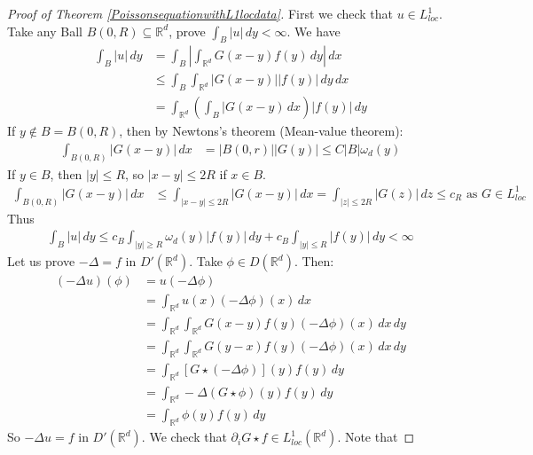 \documentclass{report}
\theoremstyle{tommy}
\begin{document}
  \begin{proof}[Proof of Theorem \ref{PoissonsequationwithL1locdata}]
    First we check that \(u \in L_{loc}^1\). Take any Ball \(B(0, R) \subseteq \mathbb{R}^d\), prove \(\int_B |u| \, dy < \infty\). We have 
    \begin{align*}
      \int_B |u| \, dy 
      &= \int_B \left| \int_{\mathbb{R}^d} G(x-y) f(y) \, dy \right| \, dx \\
      &\le \int_B \int_{\mathbb{R}^d} |G(x-y)||f(y)| \, dy \, dx \\
      &= \int_{\mathbb{R}^d} \left(\int_B |G(x-y) \, dx\right)|f(y)| \, dy
    \end{align*}
    If \(y \notin B = B(0,R)\), then by Newtons's theorem (Mean-value theorem):
    \begin{align*}
      \int_{B(0, R)} |G(x-y)| \, dx
      &= |B(0, r)| |G(y)|
      \le C|B| \omega_d(y)
    \end{align*}
    If \(y \in B\), then \(|y| \le R\), so \(|x-y| \le 2 R\) if \(x \in B\).
    \begin{align*}
      \int_{B(0,R)}|G(x-y)| \, dx
      &\le \int_{|x-y| \le 2 R} |G(x-y)| \, dx
      = \int_{|z| \le 2 R} |G(z)| \, dz 
      \le c_R \text{ as } G \in L_{loc}^1
    \end{align*}
    Thus
    \begin{align*}
      \int_B |u| \, dy 
      \le c_B \int_{|y| \ge R} \omega_d (y) |f(y)|\, dy + c_B \int_{|y| \le R} |f(y)| \, dy < \infty
    \end{align*}
    Let us prove \(- \Delta = f\) in \(D'(\mathbb{R}^d)\). Take \(\phi \in D(\mathbb{R}^d)\). Then:
    \begin{align*}
      (-\Delta u)(\phi)
      &= u(-\Delta \phi)\\
      &= \int_{\mathbb{R}^d} u(x) (-\Delta \phi)(x) \, dx \\
      &= \int_{\mathbb{R}^d}\int_{\mathbb{R}^d} G(x-y) f(y) (-\Delta \phi)(x) \, dx \, dy\\
      &= \int_{\mathbb{R}^d}\int_{\mathbb{R}^d} G(y-x) f(y) (-\Delta \phi)(x) \, dx \, dy \\
      &= \int_{\mathbb{R}^d} [G \star (-\Delta \phi)](y) f(y) \, dy \\
      &= \int_{\mathbb{R}^d} -\Delta(G\star \phi)(y) f(y) \, dy \\
      &= \int_{\mathbb{R}^d} \phi(y) f(y) \, dy
    \end{align*}
    So \(-\Delta u = f\) in \(D'(\mathbb{R}^d)\). We check that \(\partial_i G \star f \in L_{loc}^1(\mathbb{R}^d)\). Note that 

\end{proof}
\end{document}

